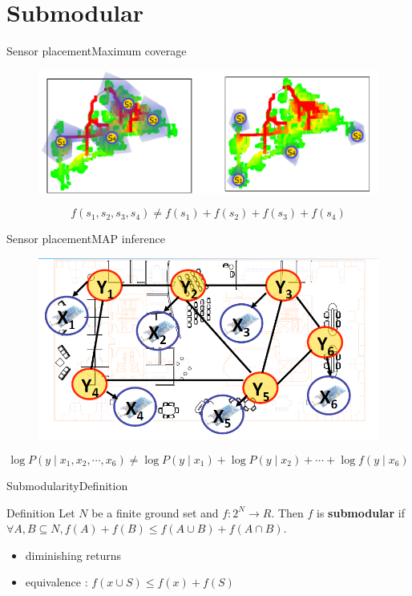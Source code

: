\section{Submodular}

\begin{frame}{Sensor placement}{Maximum coverage}
\begin{figure}
	\centering
	\includegraphics[width = \textwidth]{./figure/maximum_coverage}
\end{figure}
\begin{equation}
\nonumber
f( s_{1} , s_{2} , s_{3} , s_{4} ) \neq f( s_{1} ) + f( s_{2} ) + f( s_{3} ) + f( s_{4} )
\end{equation}	
\end{frame}

\begin{frame}{Sensor placement}{MAP inference}
\begin{figure}
	\centering
	\includegraphics[width = .7 \textwidth]{./figure/map_inference}
\end{figure}
\begin{equation}
\nonumber
\log P( y \mid x_{1} , x_{2} , \cdots , x_{6} ) \neq \log P( y \mid x_{1} ) + \log P( y \mid x_{2} ) + \cdots + \log f( y \mid x_{6} )
\end{equation}		
\end{frame}

\begin{frame}{Submodularity}{Definition}
\begin{block}{Definition}
Let $ N $ be a finite ground set and $ f : 2^{N} \rightarrow R $. Then $ f $ is \textbf{submodular} if $ \forall A, B \subseteq N,
f(A) + f(B) \leq f(A \cup B) + f(A \cap B). $
\end{block}
\begin{itemize}
\item diminishing returns
\item equivalence : $ f(x \cup S) \leq f(x) + f(S) $
\end{itemize}
\end{frame}


